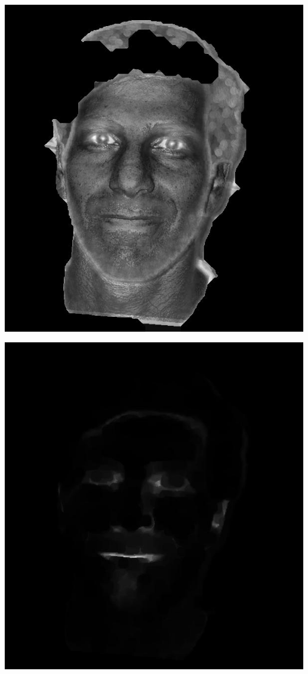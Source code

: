\begin{Figure}
  \centering
    \includegraphics[width=0.5\columnwidth]{images/im9_eye.jpg}
\end{Figure}

\begin{Figure}
  \centering
    \includegraphics[width=0.5\columnwidth]{images/im9_mouth.jpg}
\end{Figure}

